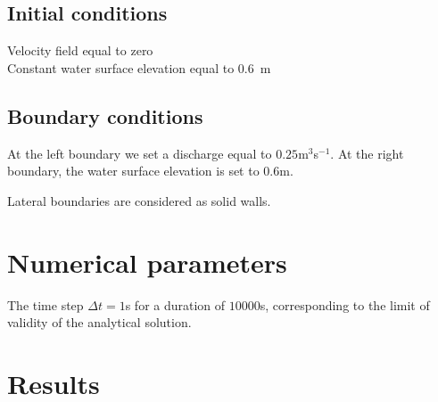 \subsection{Initial conditions}
%
Velocity field equal to zero\\
Constant water surface elevation equal to $0.6$~m
%
\subsection{Boundary conditions}
%
At the left boundary we set a discharge equal to $0.25$m$^3$s$^{-1}$. At the right boundary, the water surface elevation is set to $0.6$m.

Lateral boundaries are considered as solid walls.
%

%
%
\section{Numerical parameters}

The time step $\Delta t=1$s for a duration of $10000$s, corresponding to the limit of validity of the analytical solution.
%
%
\section{Results}
%

%
%
%
%




